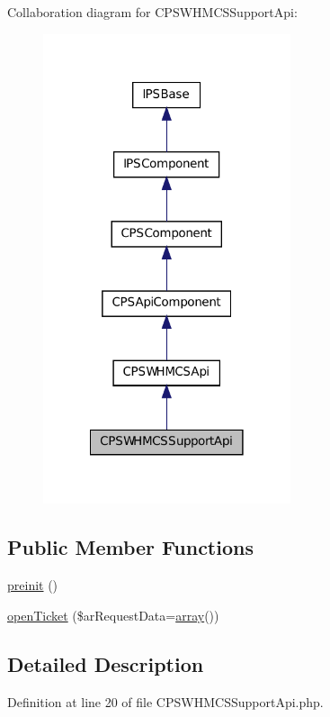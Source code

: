 Collaboration diagram for CPSWHMCSSupportApi:\nopagebreak
\begin{figure}[H]
\begin{center}
\leavevmode
\includegraphics[width=206pt]{classCPSWHMCSSupportApi__coll__graph}
\end{center}
\end{figure}
\subsection*{Public Member Functions}
\begin{DoxyCompactItemize}
\item 
\hyperlink{classCPSWHMCSSupportApi_a2dc262e99b1c246b56f27626bfe699ff}{preinit} ()
\item 
\hyperlink{classCPSWHMCSSupportApi_aa69607d67136ffc0cc745d2c5a3c94f3}{openTicket} (\$arRequestData=\hyperlink{list_8php_aa3205d038c7f8feb5c9f01ac4dfadc88}{array}())
\end{DoxyCompactItemize}


\subsection{Detailed Description}


Definition at line 20 of file CPSWHMCSSupportApi.php.



